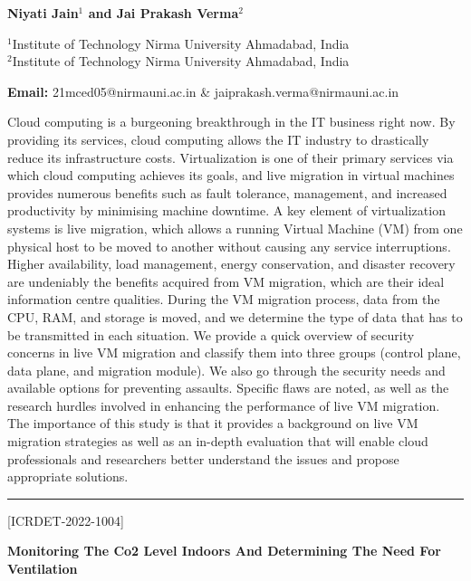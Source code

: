 \documentclass[twoside,11pt]{amsart}
\begin{document}
\centerline{\textbf{ Niyati Jain$^{1}$ and Jai Prakash Verma$^{2}$}}
\vskip 5mm
\begin{flushleft}
$^{1}$Institute of Technology
Nirma University
Ahmadabad, India\\
$^{2}$Institute of Technology Nirma University Ahmadabad, India
\vskip 2mm
\end{flushleft}
\vskip 2mm
\begin{flushleft}
{\bf Email:} 21mced05@nirmauni.ac.in \& jaiprakash.verma@nirmauni.ac.in
\end{flushleft}
\vskip 5mm
Cloud computing is a burgeoning breakthrough in
the IT business right now. By providing its services, cloud
computing allows the IT industry to drastically reduce its infrastructure
costs. Virtualization is one of their primary services
via which cloud computing achieves its goals, and live migration
in virtual machines provides numerous benefits such as fault tolerance,
management, and increased productivity by minimising
machine downtime. A key element of virtualization systems is
live migration, which allows a running Virtual Machine (VM)
from one physical host to be moved to another without causing
any service interruptions. Higher availability, load management,
energy conservation, and disaster recovery are undeniably the
benefits acquired from VM migration, which are their ideal
information centre qualities. During the VM migration process,
data from the CPU, RAM, and storage is moved, and we
determine the type of data that has to be transmitted in each
situation. We provide a quick overview of security concerns
in live VM migration and classify them into three groups
(control plane, data plane, and migration module). We also go
through the security needs and available options for preventing
assaults.
\newpage
Specific flaws are noted, as well as the research hurdles
involved in enhancing the performance of live VM migration. The
importance of this study is that it provides a background on live
VM migration strategies as well as an in-depth evaluation that
will enable cloud professionals and researchers better understand
the issues and propose appropriate solutions.
\vskip 5mm
\rule{\textwidth}{0.5pt}
\vskip 5mm
\begin{flushleft}
\centerline{[ICRDET-2022-1004]}
\end{flushleft}
\begin{center}\bf\LARGE
Monitoring The Co2 Level Indoors And Determining The Need For Ventilation
\end{center}
\vskip 5mm
\end{document}
